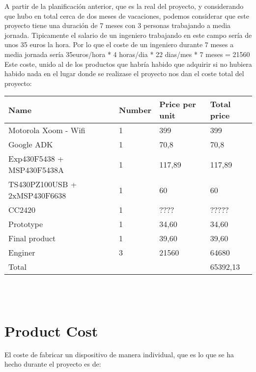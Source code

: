 	A partir de la planificación anterior, que es la real del proyecto, y considerando que hubo en total cerca de dos meses de vacaciones, podemos considerar que este proyecto tiene una duración de 7 meses con 3 personas trabajando a media jornada. Tipicamente el salario de un ingeniero trabajando en este campo sería de unos 35 euros la hora. Por lo que el coste de un ingeniero durante 7 meses a media jornada sería 35euros/hora * 4 horas/dia * 22 dias/mes * 7 meses = 21560\\

	Este coste, unido al de los productos que habría habido que adquirir si no hubiera habido nada en el lugar donde se realizase el proyecto nos dan el coste total del proyecto:\\

\begin{tabular}{| p{5cm} |l | l | l |} %
\hline
   Name & Number& Price per unit & Total price\\ \hline
   Motorola Xoom - Wifi & 1 & 399 & 399\\ \hline
   Google ADK & 1 & 70,8 & 70,8\\ \hline
   Exp430F5438 + MSP430F5438A & 1 & 117,89 & 117,89\\ \hline
   TS430PZ100USB + 2xMSP430F6638 & 1 & 60 & 60\\ \hline
   CC2420 & 1 & ???? & ?????\\ \hline
   Prototype & 1 & 34,60 & 34,60\\ \hline
   Final product & 1 & 39,60 & 39,60\\ \hline
   Enginer & 3 & 21560 & 64680\\ \hline
   Total & & & 65392,13\\ \hline
\hline
\end{tabular}\\\\


\chapter{Product Cost}
\label{ch:cost}

	El coste de fabricar un dispositivo de manera individual, que es lo que se ha hecho durante el proyecto es de:

